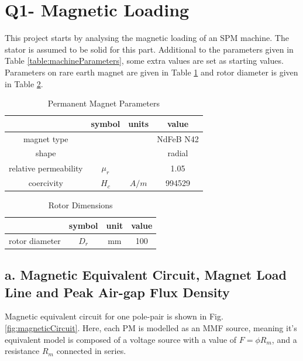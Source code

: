 \documentclass[a4paper, 11pt, titlepage]{article}
\begin{document}
\section{Q1- Magnetic Loading}
\label{sec:Q1}

This project starts by analysing the magnetic loading of an SPM machine. The stator is assumed to be solid for this part. Additional to the parameters given in Table \ref{table:machineParameters}, some extra values are set as starting values. Parameters on rare earth magnet are given in Table \ref{fig:PMParameters} and rotor diameter is given in Table \ref{table:rotorParameter}.





\begin{table}[h]
	\begin{center}
		\begin{tabular}{c|c|c|c}
			 & symbol & units & value \\
			\hline
			magnet type & & & NdFeB N42 \\
			shape & & & radial \\ 
			relative permeability & $\mu_r$ & & 1.05 \\
			coercivity & $H_c$ & $A/m$ & 994529 \\
			\hline
		\end{tabular}
	\end{center}
	\caption{Permanent Magnet Parameters}
	\label{fig:PMParameters}
\end{table}


\begin{table}[h]
	\begin{center}
		\begin{tabular}{c|c|c|c}
			 & symbol & unit & value \\
			\hline
			rotor diameter & $D_r$ & mm & 100 \\
			\hline
		\end{tabular}
	\end{center}
	\caption{Rotor Dimensions}
	\label{table:rotorParameter}
\end{table}




\subsection{a. Magnetic Equivalent Circuit, Magnet Load Line and Peak Air-gap Flux Density}

Magnetic equivalent circuit for one pole-pair is shown in Fig. \ref{fig:magneticCircuit}. Here, each PM is modelled as an MMF source, meaning it's equivalent model is composed of a voltage source with a value of $F=\phi R_m$, and a resistance $R_m$ connected in series.
\end{document}
